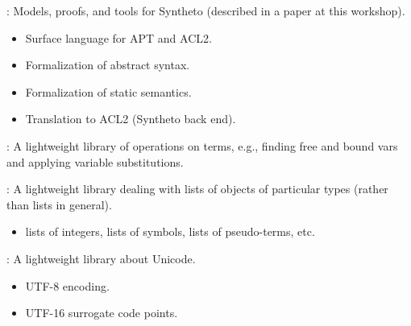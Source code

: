 
\begin{frame}

\newlibtitle

:
Models, proofs, and tools for Syntheto (described in a paper at this workshop).
\begin{itemize}
\item Surface language for APT and ACL2.
\item Formalization of abstract syntax.
\item Formalization of static semantics.
\item Translation to ACL2 (Syntheto back end).
\end{itemize}

\end{frame}


\begin{frame}

\newlibtitle

:
A lightweight library of operations on terms, e.g., finding free and
bound vars and applying variable substitutions.

\end{frame}


\begin{frame}

\newlibtitle

:
A lightweight library dealing with lists of objects of particular
types (rather than lists in general).
\begin{itemize}
\item lists of integers, lists of symbols, lists of pseudo-terms, etc.
\end{itemize}

\end{frame}


\begin{frame}

\newlibtitle

:
A lightweight library about Unicode.
\begin{itemize}
\item UTF-8 encoding.
\item UTF-16 surrogate code points.
\end{itemize}

\end{frame}

